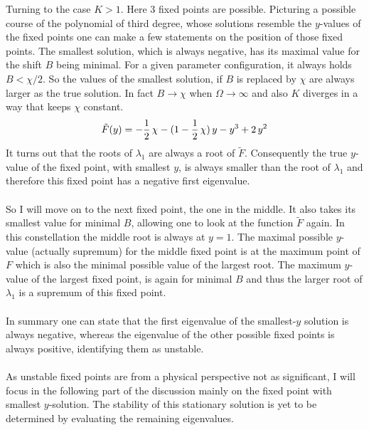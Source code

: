 Turning to the case $K>1$. Here 3 fixed points are possible. Picturing a possible course of the polynomial of third degree, whose solutions resemble the $y$-values of the fixed points one can make a few statements on the position of those fixed points. The smallest solution, which is always negative, has its maximal value for the shift $B$ being minimal. For a given parameter configuration, it always holds $B<\chi/2$. So the values of the smallest solution, if $B$ is replaced by $\chi$ are always larger as the true solution. In fact $B\rightarrow\chi$ when $\Omega\rightarrow\infty$ and also $K$ diverges in a way that keeps $\chi$ constant.
\begin{align*}
    \tilde{F}({y})=-\frac{1}{2}\,\chi-(1-\frac{1}{2}\,\chi)\,{y}    - {y}^3+2\,{y}^2
\end{align*}
It turns out that the roots of $\lambda_1$ are always a root of $\tilde{F}$. Consequently the true $y$-value of the fixed point, with smallest $y$, is always smaller than the root of $\lambda_1$ and therefore this fixed point has a negative first eigenvalue.\\\\
So I will move on to the next fixed point, the one in the middle. It also takes its smallest value for minimal $B$, allowing one to look at the function $\tilde{F}$ again. In this constellation the middle root is always at ${y}=1$. The maximal possible $y$-value (actually supremum) for the middle fixed point is at the maximum point of $F$ which is also the minimal possible value of the largest root. The maximum $y$-value of the largest fixed point, is again for minimal $B$ and thus the larger root of $\lambda_1$ is a supremum of this fixed point.\\\\
In summary one can state that the first eigenvalue of the smallest-$y$ solution is always negative, whereas the eigenvalue of the other possible fixed points is always positive, identifying them as unstable. \\\\As unstable fixed points are from a physical perspective not as significant, I will focus in the following part of the discussion mainly on the fixed point with smallest $y$-solution. The stability of this stationary solution is yet to be determined by evaluating the remaining eigenvalues.
